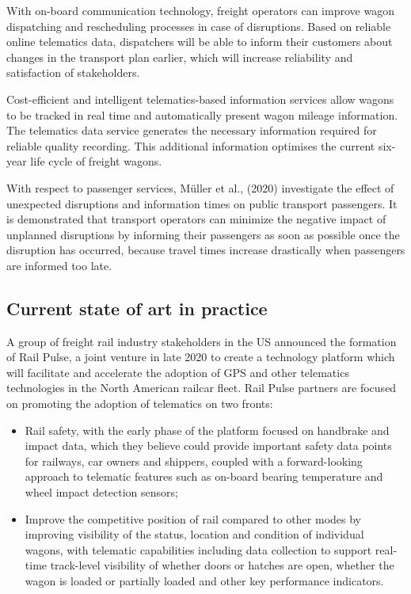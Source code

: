 \documentclass[
]{book}
\providecommand{\tightlist}{%
  \setlength{\itemsep}{0pt}\setlength{\parskip}{0pt}}
\begin{document}
With on-board communication technology, freight operators can improve wagon dispatching and rescheduling processes in case of disruptions. Based on reliable online telematics data, dispatchers will be able to inform their customers about changes in the transport plan earlier, which will increase reliability and satisfaction of stakeholders.

Cost-efficient and intelligent telematics-based information services allow wagons to be tracked in real time and automatically present wagon mileage information. The telematics data service generates the necessary information required for reliable quality recording. This additional information optimises the current six-year life cycle of freight wagons.

With respect to passenger services, Müller et al., (2020) investigate the effect of unexpected disruptions and information times on public transport passengers. It is demonstrated that transport operators can minimize the negative impact of unplanned disruptions by informing their passengers as soon as possible once the disruption has occurred, because travel times increase drastically when passengers are informed too late.

\hypertarget{current-state-of-art-in-practice-21}{%
\subsection*{Current state of art in practice}\label{current-state-of-art-in-practice-21}}

A group of freight rail industry stakeholders in the US announced the formation of Rail Pulse, a joint venture in late 2020 to create a technology platform which will facilitate and accelerate the adoption of GPS and other telematics technologies in the North American railcar fleet. Rail Pulse partners are focused on promoting the adoption of telematics on two fronts:

\begin{itemize}
\tightlist
\item
  Rail safety, with the early phase of the platform focused on handbrake and impact data, which they believe could provide important safety data points for railways, car owners and shippers, coupled with a forward-looking approach to telematic features such as on-board bearing temperature and wheel impact detection sensors;
\item
  Improve the competitive position of rail compared to other modes by improving visibility of the status, location and condition of individual wagons, with telematic capabilities including data collection to support real-time track-level visibility of whether doors or hatches are open, whether the wagon is loaded or partially loaded and other key performance indicators.
\end{itemize}
\end{document}

